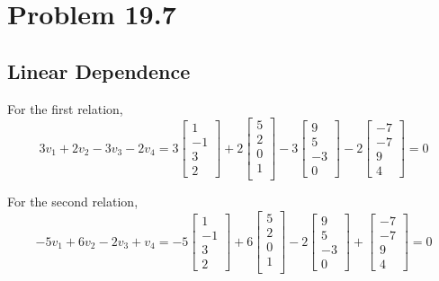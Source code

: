\documentclass{article}
\theoremstyle{named}
\begin{document}
\section{Problem 19.7} 

\subsection{Linear Dependence} 

For the first relation, 
\[
    3v_1 + 2v_2 - 3v_3 - 2v_4 = 3\begin{bmatrix} 1 \\ -1 \\ 3 \\ 2 \end{bmatrix} + 2 \begin{bmatrix} 5 \\ 2\\ 0 \\ 1 \\ \end{bmatrix} - 3 \begin{bmatrix} 9 \\ 5 \\ -3 \\ 0 \end{bmatrix} - 2 \begin{bmatrix} -7 \\ -7 \\ 9 \\ 4 \end{bmatrix} = 0
\]

For the second relation, 
\[
    -5v_1 + 6v_2 - 2v_3 + v_4 = -5\begin{bmatrix} 1 \\ -1 \\ 3 \\ 2 \end{bmatrix} + 6 \begin{bmatrix} 5 \\ 2\\ 0 \\ 1 \\ \end{bmatrix} - 2 \begin{bmatrix} 9 \\ 5 \\ -3 \\ 0 \end{bmatrix} + \begin{bmatrix} -7 \\ -7 \\ 9 \\ 4 \end{bmatrix} = 0
\]
\end{document}
